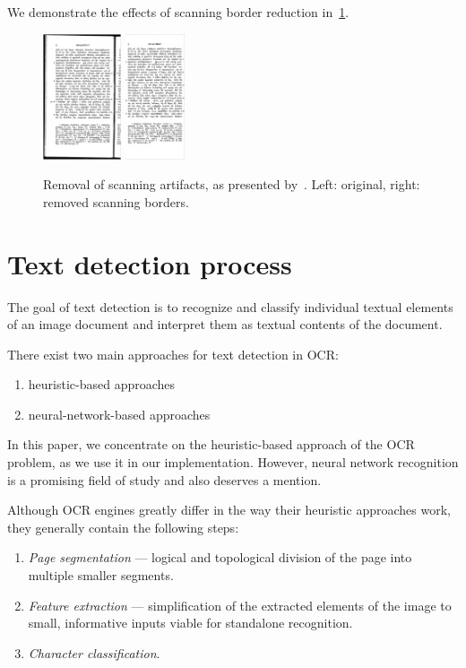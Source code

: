 We demonstrate the effects of scanning border reduction in~\cref{fig:marginalNoise}.

\begin{figure}
\centering
\includegraphics[height=10em]{img/preprocessing/scan_borders_orig.png}
\qquad
\includegraphics[height=10em]{img/preprocessing/scan_borders_result.png}
\caption{Removal of scanning artifacts, as presented by~\citet{TesseractQual}. Left: original, right: removed scanning borders.}
\label{fig:marginalNoise}
\end{figure}

\section{Text detection process}

The goal of text detection is to recognize and classify individual textual elements of an image document and interpret them as textual contents of the document.

There exist two main approaches for text detection in OCR:
\begin{enumerate}
    \item heuristic-based approaches
    \item neural-network-based approaches
\end{enumerate}

In this paper, we concentrate on the heuristic-based approach of the OCR problem, as we use it in our implementation. However, neural network recognition is a promising field of study and also deserves a mention.

Although OCR engines greatly differ in the way their heuristic approaches work, they generally contain the following steps:
\begin{enumerate}
    \item \emph{Page segmentation} --- logical and topological division of the page into multiple smaller segments.
    \item \emph{Feature extraction} --- simplification of the extracted elements of the image to small, informative inputs viable for standalone recognition.
    \item \emph{Character classification}.
\end{enumerate}

